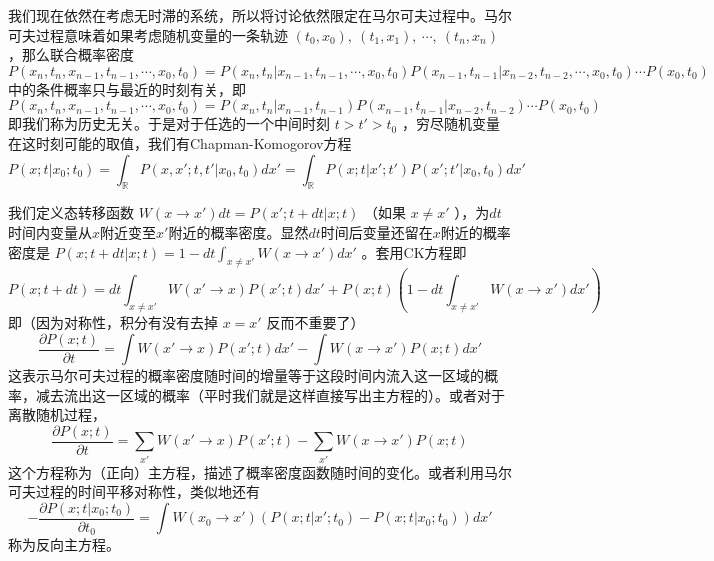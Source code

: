 \documentclass{ctexart}
\begin{document}
我们现在依然在考虑无时滞的系统，所以将讨论依然限定在马尔可夫过程中。马尔可夫过程意味着如果考虑随机变量的一条轨迹 $(t_0,x_0),\ (t_1,x_1),\ \cdots,\ (t_n,x_n)$ ，那么联合概率密度
\begin{equation}
P(x_n,t_n,x_{n-1},t_{n-1},\cdots,x_0,t_0)=P(x_n,t_n|x_{n-1},t_{n-1},\cdots,x_0,t_0)P(x_{n-1},t_{n-1}|x_{n-2},t_{n-2},\cdots,x_0,t_0)\cdots P(x_0,t_0)
\end{equation}
中的条件概率只与最近的时刻有关，即
\begin{equation}
P(x_n,t_n,x_{n-1},t_{n-1},\cdots,x_0,t_0)=P(x_n,t_n|x_{n-1},t_{n-1})P(x_{n-1},t_{n-1}|x_{n-2},t_{n-2})\cdots P(x_0,t_0)
\end{equation}
即我们称为历史无关。于是对于任选的一个中间时刻 $t>t'>t_0$ ，穷尽随机变量在这时刻可能的取值，我们有Chapman-Komogorov方程
\begin{equation}
P(x;t|x_0;t_0)=\int_\mathbb{R} P(x,x';t,t'|x_0,t_0)dx'=\int_\mathbb{R} P(x;t|x';t')P(x';t'|x_0,t_0)dx'
\end{equation}

我们定义态转移函数 $W(x\to x')dt=P(x';t+dt|x;t)$ （如果 $x\neq x'$ ），为$dt$时间内变量从$x$附近变至$x'$附近的概率密度。显然$dt$时间后变量还留在$x$附近的概率密度是 $P(x;t+dt|x;t)=1-dt\int_{x\neq x'} W(x\to x')dx'$ 。套用CK方程即
\begin{equation}
P(x;t+dt)=dt\int_{x\neq x'} W(x'\to x)P(x';t)dx'+P(x;t)\left(1-dt\int_{x\neq x'} W(x\to x')dx'\right)
\end{equation}
即（因为对称性，积分有没有去掉 $x=x'$ 反而不重要了）
\begin{equation}
\frac{\partial P(x;t)}{\partial t}=\int W(x'\to x)P(x';t)dx'-\int W(x\to x')P(x;t)dx'
\end{equation}
这表示马尔可夫过程的概率密度随时间的增量等于这段时间内流入这一区域的概率，减去流出这一区域的概率（平时我们就是这样直接写出主方程的）。或者对于离散随机过程，
\begin{equation}
\frac{\partial P(x;t)}{\partial t}=\sum_{x'}W(x'\to x)P(x';t)-\sum_{x'} W(x\to x')P(x;t)
\end{equation}
这个方程称为（正向）主方程，描述了概率密度函数随时间的变化。或者利用马尔可夫过程的时间平移对称性，类似地还有
\begin{equation}
-\frac{\partial P(x;t|x_0;t_0)}{\partial t_0}=\int W(x_0\to x')(P(x;t|x';t_0)-P(x;t|x_0;t_0))dx'
\end{equation}
称为反向主方程。
\end{document}
